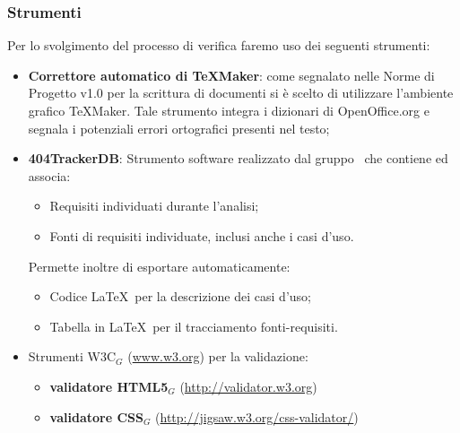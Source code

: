 \subsubsection{Strumenti}
Per lo svolgimento del processo di verifica faremo uso dei seguenti strumenti:
\begin{itemize}
	\item \textbf{Correttore automatico di TeXMaker}: come segnalato nelle Norme di Progetto v1.0 per la scrittura di documenti si è scelto di utilizzare l'ambiente grafico TeXMaker. Tale strumento integra i dizionari di OpenOffice.org e segnala i potenziali
	errori ortografici presenti nel testo;
	
	\item \textbf{404TrackerDB}: Strumento software realizzato dal gruppo \gruppo\ che contiene ed associa:
	\begin{itemize}
		\item Requisiti individuati durante l'analisi;
		\item Fonti di requisiti individuate, inclusi anche i casi d'uso.
	\end{itemize}
	Permette inoltre di esportare automaticamente:
	\begin{itemize}
		\item Codice \LaTeX\ per la descrizione dei casi d'uso;
		\item Tabella in \LaTeX\ per il tracciamento fonti-requisiti.
	\end{itemize}

	\item Strumenti W3C$_G$ (\href{www.w3.org}{www.w3.org}) per la validazione:
	    \begin{itemize}
	    	\item \textbf{validatore HTML5$_G$} (\href{http://validator.w3.org}{http://validator.w3.org})
	    	\item \textbf{validatore CSS$_G$}
	    	(\href{http://jigsaw.w3.org/css-validator/}{http://jigsaw.w3.org/css-validator/})
	    \end{itemize}
	

\end{itemize}
